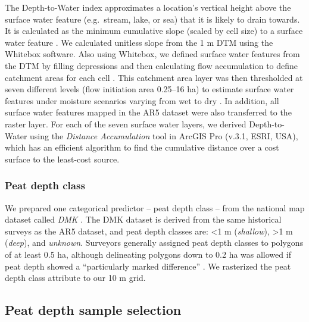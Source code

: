 \documentclass[soil, manuscript]{copernicus}
\begin{document}
The Depth-to-Water index \citep{murphyMappingWetlandsComparison2007} approximates a location's vertical height above the surface water feature (e.g.~stream, lake, or sea) that it is likely to drain towards.
It is calculated as the minimum cumulative slope (scaled by cell size) to a surface water feature \citep[eq. 5 in][]{murphyTopographicModellingSoil2009}.
We calculated unitless slope from the 1 m DTM using the Whitebox software.
Also using Whitebox, we defined surface water features from the DTM by filling depressions and then calculating flow accumulation to define catchment areas for each cell \citep{schonauerSpatiotemporalPredictionSoil2021, schonauerRcodeCalculatingDepthwater2021}.
This catchment area layer was then thresholded at seven different levels (flow initiation area 0.25--16 ha) to estimate surface water features under moisture scenarios varying from wet to dry \citep{murphyModellingMappingTopographic2011, agrenEvaluatingDigitalTerrain2014, schonauerSpatiotemporalPredictionSoil2021}.
In addition, all surface water features mapped in the AR5 dataset were also transferred to the raster layer.
For each of the seven surface water layers, we derived Depth-to-Water using the \emph{Distance Accumulation} tool in ArcGIS Pro (v.3.1, ESRI, USA), which has an efficient algorithm to find the cumulative distance over a cost surface to the least-cost source.

\subsubsection{Peat depth class}

We prepared one categorical predictor -- peat depth class -- from the national map dataset called \emph{DMK} \citep{ahlstromAR5Klassifikasjonssystem2019}.
The DMK dataset is derived from the same historical surveys as the AR5 dataset, and peat depth classes are: \textless1 m (\emph{shallow}), \textgreater1 m (\emph{deep}), and \emph{unknown}.
Surveyors generally assigned peat depth classes to polygons of at least 0.5 ha, although delineating polygons down to 0.2 ha was allowed if peat depth showed a ``particularly marked difference'' \citep{bjordalMarkslagsklassifikasjonOkonomiskKartverk2007}.
We rasterized the peat depth class attribute to our 10 m grid.

\subsection{Peat depth sample selection}
\end{document}

